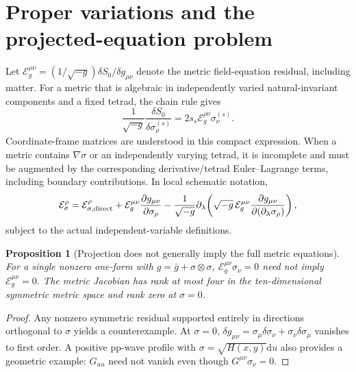 \documentclass[11pt,a4paper]{article}
\newcommand{\dd}{\mathrm d}
\newtheorem{proposition}[theorem]{Proposition}
\begin{document}
\section{Proper variations and the projected-equation problem}\label{sec:variation}
Let $\mathcal E_g^{\mu\nu}=(1/\sqrt{-g})\delta S_0/\delta g_{\mu\nu}$ denote the metric field-equation residual, including matter. For a metric that is algebraic in independently varied natural-invariant components and a fixed tetrad, the chain rule gives
\begin{equation}\label{eq:proj-chain}
 \frac1{\sqrt{-g}}\frac{\delta S_0}{\delta\sigma_\rho^{(s)}}
 =2s_s\mathcal E_g^{\rho\nu}\sigma_\nu^{(s)}.
\end{equation}
Coordinate-frame matrices are understood in this compact expression. When a metric contains $\nabla\sigma$ or an independently varying tetrad, it is incomplete and must be augmented by the corresponding derivative/tetrad Euler--Lagrange terms, including boundary contributions. In local schematic notation,
\begin{equation}\label{eq:derivative-chain}
\mathcal E_\sigma^\rho=\mathcal E_{\sigma,\rm direct}^\rho
+\mathcal E_g^{\mu\nu}\frac{\partial g_{\mu\nu}}{\partial\sigma_\rho}
-\frac1{\sqrt{-g}}\partial_\lambda\!\left(\sqrt{-g}\,\mathcal E_g^{\mu\nu}
\frac{\partial g_{\mu\nu}}{\partial(\partial_\lambda\sigma_\rho)}\right),
\end{equation}
subject to the actual independent-variable definitions.

\begin{proposition}[Projection does not generally imply the full metric equations]\label{prop:projection}
For a single nonzero one-form with $g=\bar g+\sigma\otimes\sigma$, $\mathcal E_g^{\mu\nu}\sigma_\nu=0$ need not imply $\mathcal E_g^{\mu\nu}=0$. The metric Jacobian has rank at most four in the ten-dimensional symmetric metric space and rank zero at $\sigma=0$.
\end{proposition}
\begin{proof}
Any nonzero symmetric residual supported entirely in directions orthogonal to $\sigma$ yields a counterexample. At $\sigma=0$, $\delta g_{\mu\nu}=\sigma_\mu\delta\sigma_\nu+\sigma_\nu\delta\sigma_\mu$ vanishes to first order. A positive pp-wave profile with $\sigma=\sqrt{H(x,y)}\dd u$ also provides a geometric example: $G_{uu}$ need not vanish even though $G^{\mu\nu}\sigma_\nu=0$.
\end{proof}
\end{document}
